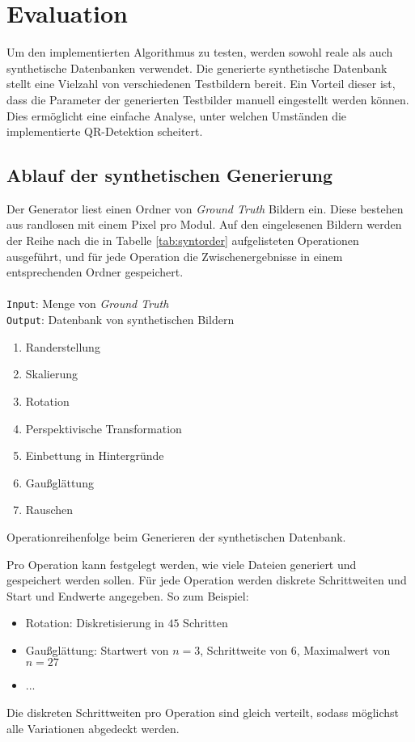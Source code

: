 \chapter{Evaluation}

Um den implementierten Algorithmus zu testen, werden sowohl reale als auch synthetische Datenbanken verwendet. Die generierte synthetische Datenbank stellt eine Vielzahl von verschiedenen Testbildern bereit. Ein Vorteil dieser ist, dass die Parameter der generierten Testbilder manuell eingestellt werden können. Dies ermöglicht eine einfache Analyse, unter welchen Umständen die implementierte QR-Detektion scheitert.

\section{Ablauf der synthetischen Generierung}

Der Generator liest einen Ordner von \emph{Ground Truth} Bildern ein. Diese bestehen aus randlosen \QRCodes mit einem Pixel pro Modul. Auf den eingelesenen Bildern werden der Reihe nach die in Tabelle \ref{tab:syntorder} aufgelisteten Operationen ausgeführt, und für jede Operation die Zwischenergebnisse in einem entsprechenden Ordner gespeichert.\\\\
\texttt{Input}: Menge von \emph{Ground Truth} \QRCodes \\
\texttt{Output}: Datenbank von synthetischen Bildern

\begin{table}[h]
\begin{multicols}{2}
\begin{enumerate}
	\item Randerstellung
	\item Skalierung
	\item Rotation
	\item Perspektivische Transformation
	\item Einbettung in Hintergründe
	\item Gaußglättung
	\item Rauschen
\end{enumerate}
\end{multicols}
\caption{Operationreihenfolge beim Generieren der synthetischen Datenbank.}\label{tab:syntorder}
\end{table}


\noindent Pro Operation kann festgelegt werden, wie viele Dateien generiert und gespeichert werden sollen.
Für jede Operation werden diskrete Schrittweiten und Start und Endwerte angegeben. So zum Beispiel:
\begin{itemize}
	\item Rotation: Diskretisierung in $45$\textdegree\xspace Schritten
	\item Gaußglättung: Startwert von $n=3$, Schrittweite von $6$, Maximalwert von $n=27$
	\item ...
\end{itemize}
Die diskreten Schrittweiten pro Operation sind gleich verteilt, sodass möglichst alle Variationen abgedeckt werden.


